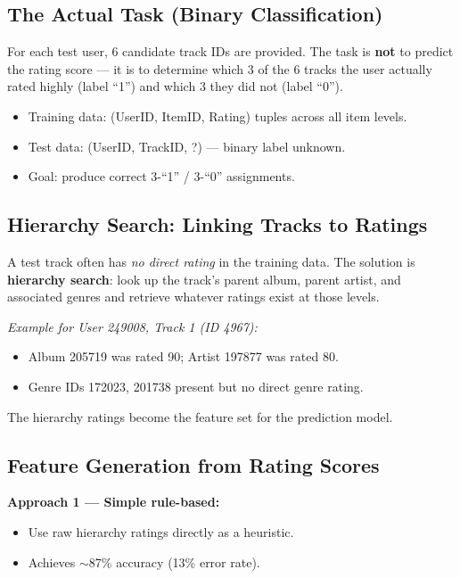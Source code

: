 \documentclass[11pt]{article}
\begin{document}
\subsection{The Actual Task (Binary Classification)}
For each test user, 6 candidate track IDs are provided. The task is
\textbf{not} to predict the rating score --- it is to determine which
3 of the 6 tracks the user actually rated highly (label ``1'') and which
3 they did not (label ``0'').

\begin{itemize}
    \item Training data: (UserID, ItemID, Rating) tuples across all item
      levels.
    \item Test data: (UserID, TrackID, ?) --- binary label unknown.
    \item Goal: produce correct 3-``1'' / 3-``0'' assignments.
\end{itemize}

\subsection{Hierarchy Search: Linking Tracks to Ratings}
A test track often has \emph{no direct rating} in the training data.
The solution is \textbf{hierarchy search}: look up the track's parent
album, parent artist, and associated genres and retrieve whatever
ratings exist at those levels.

\textit{Example for User 249008, Track 1 (ID 4967):}
\begin{itemize}
    \item Album 205719 was rated 90; Artist 197877 was rated 80.
    \item Genre IDs 172023, 201738 present but no direct genre rating.
\end{itemize}
The hierarchy ratings become the feature set for the prediction model.

\subsection{Feature Generation from Rating Scores}

\textbf{Approach 1 --- Simple rule-based:}
\begin{itemize}
    \item Use raw hierarchy ratings directly as a heuristic.
    \item Achieves $\sim$87\% accuracy (13\% error rate).
\end{itemize}
\end{document}
